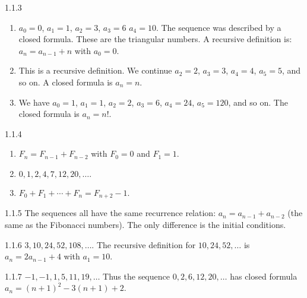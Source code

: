 \documentclass[11pt,]{book}
\theoremstyle{ptxplainnotitle}
\theoremstyle{ptxplaintitle}
\theoremstyle{ptxdefinitionnotitle}
\theoremstyle{ptxdefinitiontitle}
\theoremstyle{ptxdefinitionnotitle}
\theoremstyle{ptxdefinitiontitle}
\theoremstyle{ptxdefinitionnotitle}
\theoremstyle{ptxdefinitiontitle}
\theoremstyle{ptxdefinitiontitlenonumber}
\theoremstyle{ptxdefinitiontitlenonumber}
\numberwithin{equation}{chapter}
\begin{document}
\begin{divisionexercise}{1.1.3}
\textbf{}\hypertarget{p-125}{}%
\leavevmode%
\begin{enumerate}[label=(\alph*)]
\item\hypertarget{li-85}{}\hypertarget{p-126}{}%
\(a_0 = 0\), \(a_1 = 1\), \(a_2 = 3\), \(a_3 = 6\)  \(a_4 = 10\). The sequence was described by a closed formula.  These are the triangular numbers.  A recursive definition is: \(a_n = a_{n-1} + n\) with \(a_0 = 0\).%
\item\hypertarget{li-86}{}\hypertarget{p-127}{}%
This is a recursive definition.  We continue \(a_2 = 2\), \(a_3 = 3\), \(a_4 = 4\), \(a_5 = 5\), and so on.  A closed formula is \(a_n = n\).%
\item\hypertarget{li-87}{}\hypertarget{p-128}{}%
We have \(a_0 = 1\), \(a_1 = 1\), \(a_2 = 2\), \(a_3 = 6\), \(a_4 = 24\), \(a_5 = 120\), and so on.  The closed formula is \(a_n = n!\).%
\end{enumerate}
%
\end{divisionexercise}%
\begin{divisionexercise}{1.1.4}
\textbf{}\hypertarget{p-133}{}%
\leavevmode%
\begin{enumerate}[label=(\alph*)]
\item\hypertarget{li-91}{}\(F_n = F_{n-1} + F_{n-2}\) with \(F_0 = 0\) and \(F_1 = 1\).%
\item\hypertarget{li-92}{}\(0, 1, 2, 4, 7, 12, 20, \ldots.\)%
\item\hypertarget{li-93}{}\(F_0 + F_1 + \cdots + F_n = F_{n+2} - 1.\)%
\end{enumerate}
%
\end{divisionexercise}%
\begin{divisionexercise}{1.1.5}
\textbf{}\hypertarget{p-135}{}%
The sequences all have the same recurrence relation: \(a_n = a_{n-1} + a_{n-2}\) (the same as the Fibonacci numbers). The only difference is the initial conditions.%
\end{divisionexercise}%
\begin{divisionexercise}{1.1.6}
\textbf{}\hypertarget{p-137}{}%
\(3, 10, 24, 52, 108,\ldots\). The recursive definition for \(10, 24, 52, \ldots\) is \(a_n = 2a_{n-1} + 4\) with \(a_1 = 10\).%
\end{divisionexercise}%
\begin{divisionexercise}{1.1.7}
\textbf{}\hypertarget{p-139}{}%
\(-1, -1, 1, 5, 11, 19,\ldots\) Thus the sequence \(0, 2, 6, 12, 20,\ldots\) has closed formula \(a_n = (n+1)^2 - 3(n+1) + 2\).%
\end{divisionexercise}%
\end{document}
